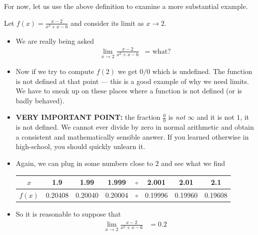 For now, let us use the above definition to examine a more substantial
example.
\begin{eg}\label{eg_1_3_2}
Let $f(x) = \frac{x-2}{x^2+x-6}$ and consider its limit as $x \to 2$.


\begin{itemize}
 \item We are really being asked
  \begin{align*}
    \lim_{x \to 2} \frac{x-2}{x^2+x-6} &= \text{ what?}
  \end{align*}
  \item Now if we try to compute $f(2)$ we get $0/0$ which is
undefined. The function is not defined at that point --- this is a good example
of why we need limits.  We have to sneak up on these places where a function is
not defined (or is badly behaved).

 \item \textbf{VERY IMPORTANT POINT:} the fraction $\frac{0}{0}$ is
\emph{not} $\infty$ and it is not $1$, it is not defined. We cannot ever divide
by zero in normal arithmetic and obtain a consistent and mathematically
sensible answer. If you learned otherwise in high-school, you should quickly
unlearn it.

\item Again, we can plug in some numbers close to $2$ and see what we find
\begin{center}
 \begin{tabular}{|c||c|c|c|c|c|c|c|}
  \hline
  $x$ & 1.9 & 1.99 & 1.999 & $\circ$ & 2.001 & 2.01 & 2.1 \\
  \hline
  $f(x)$ & 0.20408 & 0.20040 &0.20004
  & $\circ$ & 0.19996 & 0.19960 & 0.19608 \\
\hline
\end{tabular}
\end{center}
\item So it is reasonable to suppose that
\begin{align*}
 \lim_{x \to 2} \frac{x-2}{x^2+x-6} &= 0.2
\end{align*}
\end{itemize}

\end{eg}

